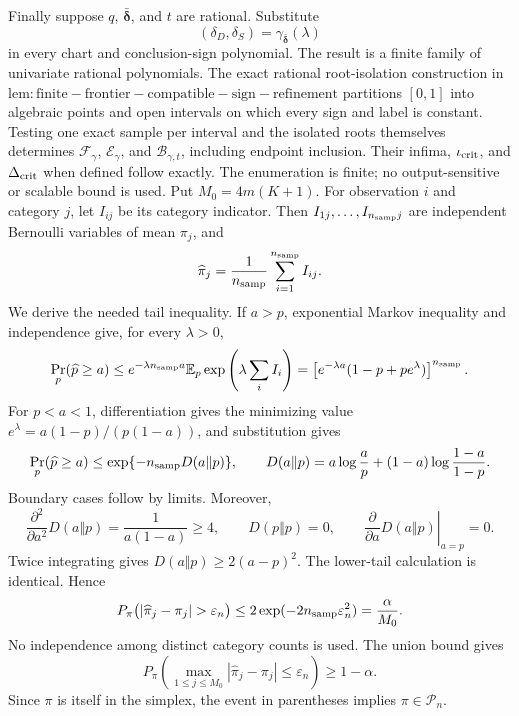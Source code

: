 Finally suppose \(q\), \(\bar{\boldsymbol\delta}\), and \(t\) are rational. Substitute
\[
 (\delta_D,\delta_S)=\gamma_{\bar{\boldsymbol\delta}}(\lambda)
\]
in every chart and conclusion-sign polynomial. The result is a finite family of univariate rational polynomials. The exact rational root-isolation construction in \(\mathrm{lem:finite-frontier-compatible-sign-refinement}\) partitions \([0,1]\) into algebraic points and open intervals on which every sign and label is constant. Testing one exact sample per interval and the isolated roots themselves determines \(\mathcal F_\gamma\), \(\mathcal E_\gamma\), and \(\mathcal B_{\gamma,t}\), including endpoint inclusion. Their infima, \(\iota_{\rm crit}\), and \(\Delta_{\rm crit}\) when defined follow exactly. The enumeration is finite; no output-sensitive or scalable bound is used.
Put \(M_0=4m(K+1)\). For observation \(i\) and category \(j\), let \(I_{ij}\) be its category indicator. Then \(I_{1j},\ldots,I_{n_{\rm samp}j}\) are independent Bernoulli variables of mean \(\pi_j\), and
\[
 \widehat\pi_j=\frac1{n_{\rm samp}}\sum_{i=1}^{n_{\rm samp}}I_{ij}.
\]
We derive the needed tail inequality. If \(a>p\), exponential Markov inequality and independence give, for every \(\lambda>0\),
\[
 \Pr_p(\widehat p\geq a)
 \leq e^{-\lambda n_{\rm samp}a}
      \mathbb E_p\exp\left(\lambda\sum_i I_i\right)
 =\left[e^{-\lambda a}(1-p+pe^\lambda)\right]^{n_{\rm samp}}.
\]
For \(p<a<1\), differentiation gives the minimizing value \(e^\lambda=a(1-p)/(p(1-a))\), and substitution gives
\[
 \Pr_p(\widehat p\geq a)
 \leq \exp\{-n_{\rm samp}D(a\Vert p)\},
 \qquad
 D(a\Vert p)=a\log\frac ap+(1-a)\log\frac{1-a}{1-p}.
\]
Boundary cases follow by limits. Moreover,
\[
 \frac{\partial^2}{\partial a^2}D(a\Vert p)
 =\frac1{a(1-a)}\geq4,
 \qquad D(p\Vert p)=0,
 \qquad \left.\frac{\partial}{\partial a}D(a\Vert p)\right|_{a=p}=0.
\]
Twice integrating gives \(D(a\Vert p)\geq2(a-p)^2\). The lower-tail calculation is identical. Hence
\[
 P_\pi\bigl(|\widehat\pi_j-\pi_j|>\varepsilon_n\bigr)
 \leq2\exp(-2n_{\rm samp}\varepsilon_n^2)
 =\frac{\alpha}{M_0}.
\]
No independence among distinct category counts is used. The union bound gives
\[
 P_\pi\left(\max_{1\leq j\leq M_0}
 |\widehat\pi_j-\pi_j|\leq\varepsilon_n\right)\geq1-\alpha.
\]
Since \(\pi\) is itself in the simplex, the event in parentheses implies \(\pi\in\mathcal P_n\).

